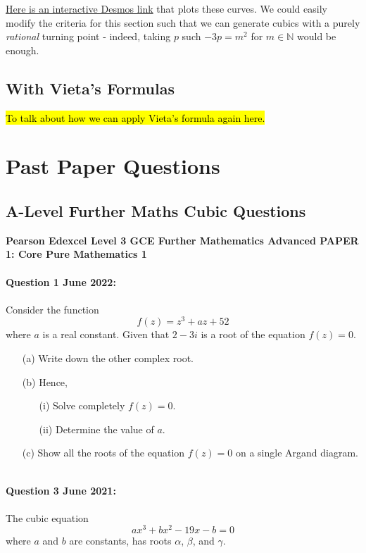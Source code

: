 \documentclass[12pt]{article}
\newcommand{\N}{\mathbb{N}}
\begin{document}
\noindent \href{https://www.desmos.com/calculator/harieviric}{Here is an interactive Desmos link} that plots these curves. We could easily modify the criteria for this section such that we can generate cubics with a purely \textit{rational} turning point - indeed, taking $p$ such $-3p = m^2$ for $m \in \N$ would be enough.

\subsection{With Vieta's Formulas}
\hl{To talk about how we can apply Vieta's formula again here.}


\section{Past Paper Questions}

\subsection{A-Level Further Maths Cubic Questions}
\textbf{Pearson Edexcel Level 3 GCE Further Mathematics
Advanced PAPER 1: Core Pure Mathematics 1}\\\\
\textbf{Question 1 June 2022:}\\\\
Consider the function 
\[f(z) = z^3 + az + 52\]
where \( a \) is a real constant. Given that \( 2 - 3i \) is a root of the equation \( f(z) = 0 \).
\begin{enumerate}
    \item[(a)] Write down the other complex root.
    \item[(b)] Hence,
    \begin{enumerate}
        \item[(i)] Solve completely \( f(z) = 0 \).
        \item[(ii)] Determine the value of \( a \).
    \end{enumerate}
    \item[(c)] Show all the roots of the equation \( f(z) = 0 \) on a single Argand diagram.\\\\
\end{enumerate}

\textbf{Question 3 June 2021:}\\\\
The cubic equation
\[ax^3 + bx^2 - 19x - b = 0\]
where \( a \) and \( b \) are constants, has roots \( \alpha \), \( \beta \), and \( \gamma \).
\end{document}

